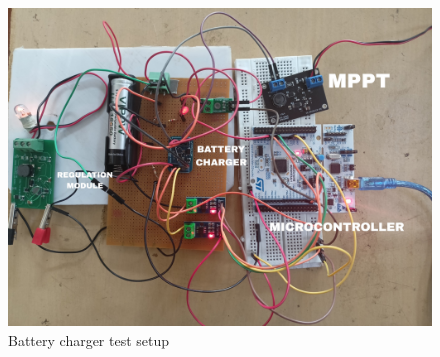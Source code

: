 \begin{figure}[H]
	\centering
	\includegraphics[width=0.72\columnwidth]{IMGS/TestSetupPics/Bat_cha_test.jpg}
	\caption{Battery charger test setup}
	\label{fig:arch}
\end{figure}

